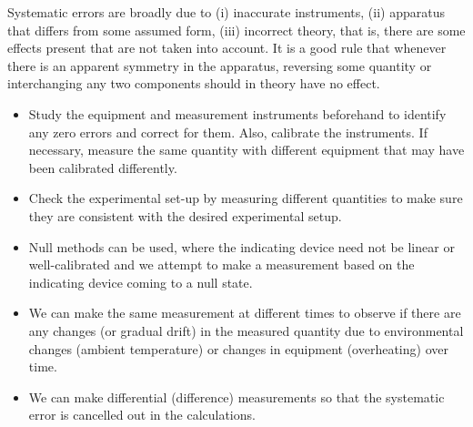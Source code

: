 \documentclass[a4paper]{article}
\begin{document}
\begin{Note}
Systematic errors are broadly due to (i) inaccurate instruments, (ii) apparatus that differs from some assumed form, (iii) incorrect theory, that is, there are some effects present that are not taken into account. It is a good rule that whenever there is an apparent symmetry in the apparatus, reversing some quantity or interchanging any two components should in theory have no effect.
\begin{itemize}
    \item Study the equipment and measurement instruments beforehand to identify any zero errors and correct for them. Also, calibrate the instruments. If necessary, measure the same quantity with different equipment that may have been calibrated differently.
    \item Check the experimental set-up by measuring different quantities to make sure they are consistent with the desired experimental setup.
    \item Null methods can be used, where the indicating device need not be linear or well-calibrated and we attempt to make a measurement based on the indicating device coming to a null state.
    \item We can make the same measurement at different times to observe if there are any changes (or gradual drift) in the measured quantity due to environmental changes (ambient temperature) or changes in equipment (overheating) over time.
    \item We can make differential (difference) measurements so that the systematic error is cancelled out in the calculations.
\end{itemize}
\end{Note}
\end{document}
